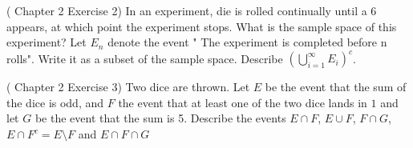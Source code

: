 \begin{ExerciseList}
	\Exercise
	\label{exercise:game_2}
    (\cite{Ross} Chapter 2 Exercise 2) In an experiment, die is rolled continually until a 6 appears, at which point the experiment stops. What is the sample space of this experiment? Let $E_n$ denote the event " The experiment is completed before n rolls". Write it as a subset of the sample space. Describe $\left(\bigcup_{i=1}^\infty E_i\right)^c$.



\Exercise (\cite{Ross} Chapter 2 Exercise 3)
Two dice are thrown. Let $E$ be the event that the sum of the dice is odd, and $F$ the event that at least one of the two dice lands in $1$ and let $G$ be the event that the sum is 5. Describe the events $E\cap F $, $E\cup F$, $F\cap G$, $E\cap F^c=E\setminus F$ and $E \cap F\cap G$


\end{ExerciseList}
